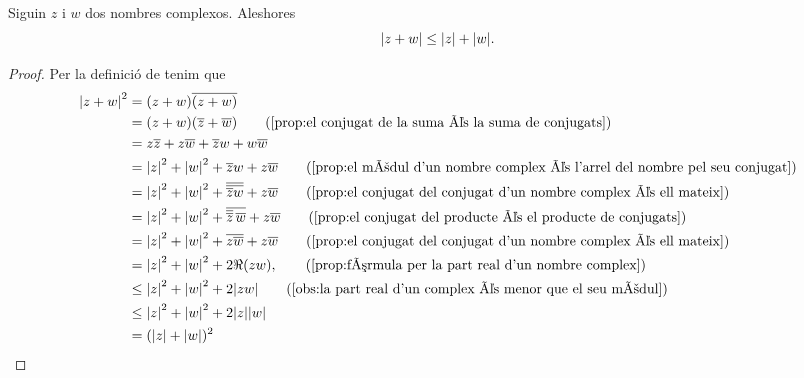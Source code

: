 \documentclass[../../Main.tex]{subfiles}
\begin{document}
	\begin{proposition}
		\label{prop:desigualta triangular nombres complexos}
		Siguin \(z\) i \(w\) dos nombres complexos.
        Aleshores
		\[
            \modul{z+w}\leq\modul{z}+\modul{w}.
        \]
		\begin{proof}
			Per la definició de  tenim que
			\begin{align*}
				\modul{z+w}^{2} &= (z+w)\conjugat{(z+w)} \\
				 &= (z+w)(\conjugat{z}+\conjugat{w}) \tag{\ref{prop:el conjugat de la suma és la suma de conjugats}} \\
				 &= z\conjugat{z}+z\conjugat{w}+\conjugat{z}w+w\conjugat{w} \\
				 &= \modul{z}^{2}+\modul{w}^{2}+\conjugat{z}w+z\conjugat{w} \tag{\ref{prop:el mòdul d'un nombre complex és l'arrel del nombre pel seu conjugat}} \\
				 &= \modul{z}^{2}+\modul{w}^{2}+\conjugat{\conjugat{\conjugat{z}w}}+z\conjugat{w} \tag{\ref{prop:el conjugat del conjugat d'un nombre complex és ell mateix}} \\
				 &= \modul{z}^{2}+\modul{w}^{2}+\conjugat{\conjugat{\conjugat{z}}\,\conjugat{w}}+z\conjugat{w} \tag{\ref{prop:el conjugat del producte és el producte de conjugats}} \\
				 &= \modul{z}^{2}+\modul{w}^{2}+\conjugat{z\conjugat{w}}+z\conjugat{w}\tag{\ref{prop:el conjugat del conjugat d'un nombre complex és ell mateix}} \\
				 &= \modul{z}^{2}+\modul{w}^{2}+2\Re(zw), \tag{\ref{prop:fórmula per la part real d'un nombre complex}} \\
				&\leq\modul{z}^{2}+\modul{w}^{2}+2\modul{zw} \tag{\ref{obs:la part real d'un complex és menor que el seu mòdul}} \\
				&\leq\modul{z}^{2}+\modul{w}^{2}+2\modul{z}\modul{w} \\
				 &= (\modul{z}+\modul{w})^{2}
			\end{align*}
		\end{proof}
	\end{proposition}
	
\end{document}

